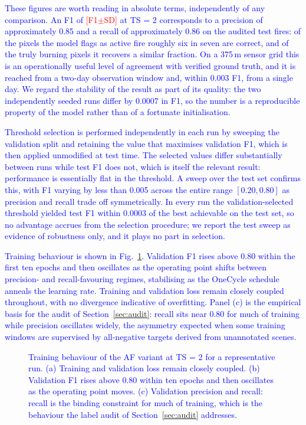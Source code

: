 \documentclass[sensors,article,submit,moreauthors,pdftex]{Definitions/mdpi}
\newcommand{\rev}[1]{\textcolor{blue}{#1}}
\newcommand{\afTStwo}{\textcolor{red}{[F1$\pm$SD]}}
\begin{document}
\rev{These figures are worth reading in absolute terms, independently of any
comparison. An F1 of \afTStwo{} at TS = 2 corresponds to a precision of
approximately 0.85 and a recall of approximately 0.86 on the audited test
fires: of the pixels the model flags as active fire roughly six in seven are
correct, and of the truly burning pixels it recovers a similar fraction. On a
375\,m sensor grid this is an operationally useful level of agreement with
verified ground truth, and it is reached from a two-day observation window and,
within 0.003 F1, from a single day. We regard the stability of the result as
part of its quality: the two independently seeded runs differ by 0.0007 in F1,
so the number is a reproducible property of the model rather than of a fortunate
initialisation.}

\rev{Threshold selection is performed independently in each run by sweeping the
validation split and retaining the value that maximises validation F1, which is
then applied unmodified at test time. The selected values differ substantially
between runs while test F1 does not, which is itself the relevant result:
performance is essentially flat in the threshold. A sweep over the test set
confirms this, with F1 varying by less than 0.005 across the entire range
$[0.20, 0.80]$ as precision and recall trade off symmetrically. In every run the
validation-selected threshold yielded test F1 within 0.0003 of the best
achievable on the test set, so no advantage accrues from the selection
procedure; we report the test sweep as evidence of robustness only, and it plays
no part in selection.}

\rev{Training behaviour is shown in Fig.~\ref{fig:curves}. Validation F1 rises
above 0.80 within the first ten epochs and then oscillates as the operating
point shifts between precision- and recall-favouring regimes, stabilising as the
OneCycle schedule anneals the learning rate. Training and validation loss remain
closely coupled throughout, with no divergence indicative of overfitting. Panel
(c) is the empirical basis for the audit of Section~\ref{sec:audit}: recall sits
near 0.80 for much of training while precision oscillates widely, the asymmetry
expected when some training windows are supervised by all-negative targets
derived from unannotated scenes.}

\begin{figure}[H]
\centering

\caption{\rev{Training behaviour of the AF variant at TS = 2 for a
representative run. (a) Training and validation loss remain closely coupled.
(b) Validation F1 rises above 0.80 within ten epochs and then oscillates as the
operating point moves. (c) Validation precision and recall: recall is the
binding constraint for much of training, which is the behaviour the label audit
of Section~\ref{sec:audit} addresses.}}
\label{fig:curves}
\end{figure}
\end{document}
